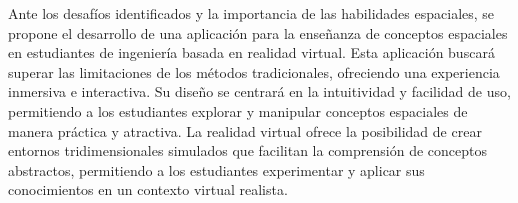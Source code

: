 Ante los desafíos identificados y la importancia de las habilidades espaciales, se propone el desarrollo de una aplicación para la enseñanza de conceptos espaciales en estudiantes de ingeniería basada en realidad virtual. Esta aplicación buscará superar las limitaciones de los métodos tradicionales, ofreciendo una experiencia inmersiva e interactiva. Su diseño se centrará en la intuitividad y facilidad de uso, permitiendo a los estudiantes explorar y manipular conceptos espaciales de manera práctica y atractiva. La realidad virtual ofrece la posibilidad de crear entornos tridimensionales simulados que facilitan la comprensión de conceptos abstractos, permitiendo a los estudiantes experimentar y aplicar sus conocimientos en un contexto virtual realista.
